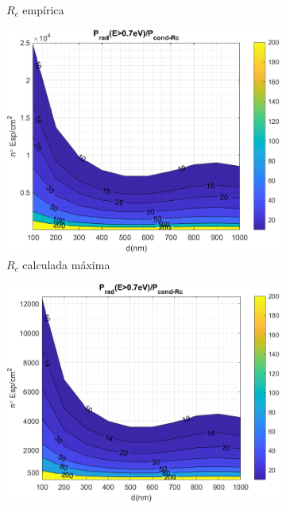 \begin{figure}[H]
\begin{subfigure}[b]{0.49\textwidth}
		\caption{$R_c$ empírica}
		\label{fig:rel_SsSiO2Ge_Rc_emp}
	\end{subfigure}
	\hfill
	\begin{subfigure}[b]{0.49\textwidth}
		\centering
			\includegraphics[width=1.00\textwidth]{figuras/Resultados/RelacionCondRad/SS_Rc.png}
		\caption{$R_c$ calculada máxima}
		\label{fig:rel_SsSiO2Ge_Rc_max}
	\end{subfigure}
	\hfill
	\begin{subfigure}[b]{0.49\textwidth}
		\centering
			\includegraphics[width=1.00\textwidth]{figuras/Resultados/RelacionCondRad/SS_Rc_Intermedio.png}

\end{subfigure}
\end{figure}
